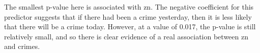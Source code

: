 The smallest p-value here is associated with zn. The negative coefficient
for this predictor suggests that if there had been a crime yesterday, then it is less likely that there will be a crime today. However, at a value of 0.017, the p-value
is still relatively small, and so there is clear evidence of a real association
between zn and crimes.


